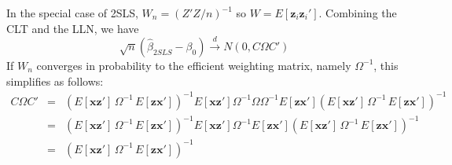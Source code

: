 \documentclass[12pt]{article}
\theoremstyle{definition}
\begin{document}
In the special case of 2SLS, $W_n = (Z'Z/n)^{-1}$ so $W = E[\mathbf{z}_i\mathbf{z}_i']$. Combining the CLT and the LLN, we have
  $$\sqrt{n}\left(\widehat{\beta}_{2SLS} - \beta_0\right) \overset{d}{\rightarrow} N(0, C\Omega C')$$
If $W_n$ converges in probability to the efficient weighting matrix, namely $\Omega^{-1}$, this simplifies as follows:
  \begin{eqnarray*}
    C\Omega C' &=&  \left( E[\mathbf{x}\mathbf{z}']\, \Omega^{-1} \,E[\mathbf{z}\mathbf{x}'] \right)^{-1} E[\mathbf{x}\mathbf{z'}] \Omega^{-1}\Omega \Omega^{-1}E[\mathbf{z}\mathbf{x}']\left( E[\mathbf{x}\mathbf{z}']\, \Omega^{-1} \,E[\mathbf{z}\mathbf{x}'] \right)^{-1}\\
      &=& \left( E[\mathbf{x}\mathbf{z}']\, \Omega^{-1} \,E[\mathbf{z}\mathbf{x}'] \right)^{-1} E[\mathbf{x}\mathbf{z'}]\Omega^{-1}
      E[\mathbf{z}\mathbf{x}']\left( E[\mathbf{x}\mathbf{z}']\, \Omega^{-1} \,E[\mathbf{z}\mathbf{x}'] \right)^{-1}\\
      &=& \left( E[\mathbf{x}\mathbf{z}']\, \Omega^{-1} \,E[\mathbf{z}\mathbf{x}'] \right)^{-1}
  \end{eqnarray*}
\end{document}
